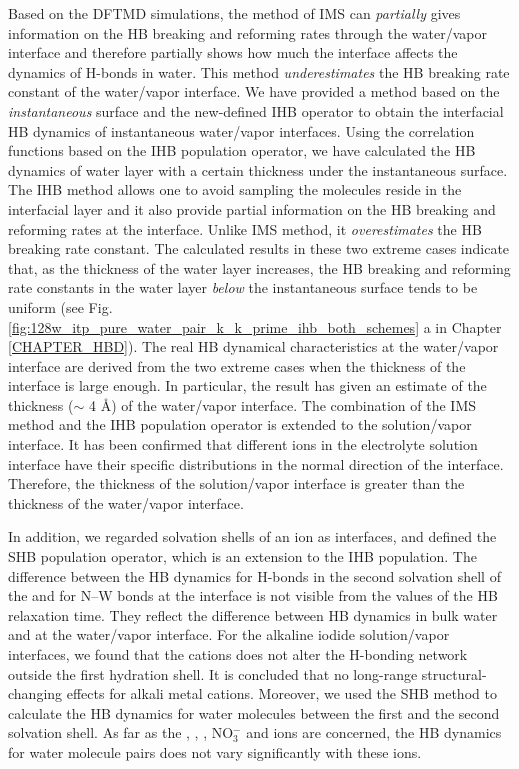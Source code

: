 Based on the DFTMD simulations, the method of IMS can \emph{partially} gives information on the HB breaking and reforming
rates through the water/vapor interface and therefore partially shows how much the interface affects the dynamics of H-bonds in water. 
This method \emph{underestimates} the HB breaking rate constant of the water/vapor interface. 
We have provided a method based on the \emph{instantaneous} surface and the new-defined
IHB operator to obtain the interfacial HB dynamics of instantaneous water/vapor interfaces.  
Using the correlation functions based on the IHB population operator, we have calculated the HB dynamics of water layer with a certain thickness 
under the instantaneous surface. 
The IHB method allows one to avoid sampling the molecules reside in the interfacial layer and
it also provide partial information on the HB breaking and reforming rates at the interface. 
Unlike IMS method, it \emph{overestimates} the HB breaking rate constant. The calculated results in these two extreme cases indicate that,
as the thickness of the water layer increases,
the HB breaking and reforming rate constants in the water layer \emph{below} the instantaneous surface tends to be uniform 
(see Fig.\thinspace\ref{fig:128w_itp_pure_water_pair_k_k_prime_ihb_both_schemes} a in Chapter \ref{CHAPTER_HBD}). 
The real HB dynamical characteristics at the water/vapor interface 
are derived from the two extreme cases when the thickness of the interface is large enough. 
In particular, the result has given an estimate of the thickness ($\sim$ 4 \AA) of the water/vapor interface.  
The combination of the IMS method and the IHB population operator is extended to the solution/vapor interface. 
It has been confirmed that different ions in the electrolyte solution interface have their specific distributions in the normal direction of the interface. 
Therefore, the thickness of the solution/vapor interface is greater than the thickness of the water/vapor interface. 

In addition, we regarded solvation shells of an ion as interfaces, 
and defined the SHB population operator, which is an extension to the IHB population.
The difference between the HB dynamics for H-bonds in the second solvation shell of the \Li and for N--W bonds 
at the interface is not visible from the values of the HB relaxation time. They reflect the difference between HB dynamics in 
bulk water and at the water/vapor interface. For the alkaline iodide solution/vapor interfaces, we found 
that the cations does not alter the H-bonding network outside the first hydration shell. 
It is concluded that no long-range structural-changing effects for alkali metal cations.
Moreover, we used the SHB method to calculate the HB dynamics for water molecules between the first and the second solvation shell.
As far as the \Li, \Na, \K, NO$^-_3$ and \I ions are concerned, 
the HB dynamics for water molecule pairs does not vary significantly with these ions.

